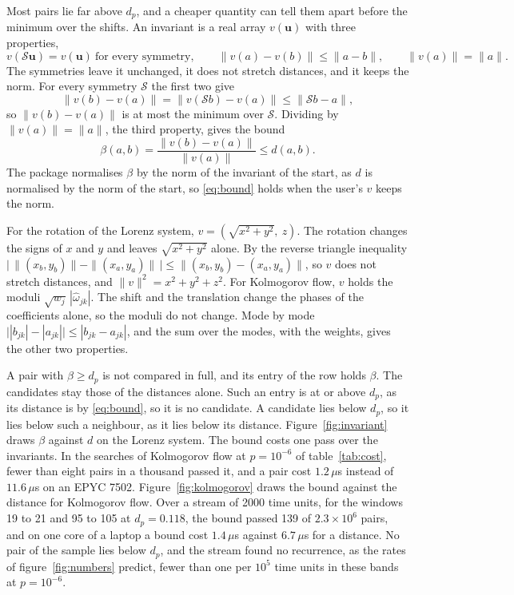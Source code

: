 \documentclass[11pt]{article}
\newcommand{\bu}{\mathbf{u}}
\begin{document}
Most pairs lie far above $d_p$, and a cheaper quantity can tell them apart before the minimum over the shifts. An invariant is a real array $v(\bu)$ with three properties,
\begin{equation}
v(\mathcal{S}\bu) = v(\bu) \ \text{for every symmetry}, \qquad \|v(a) - v(b)\| \le \|a - b\|, \qquad \|v(a)\| = \|a\| .
\label{eq:invariant}
\end{equation}
The symmetries leave it unchanged, it does not stretch distances, and it keeps the norm. For every symmetry $\mathcal{S}$ the first two give
\begin{equation}
\|v(b) - v(a)\| = \|v(\mathcal{S} b) - v(a)\| \le \|\mathcal{S} b - a\| ,
\end{equation}
so $\|v(b) - v(a)\|$ is at most the minimum over $\mathcal{S}$. Dividing by $\|v(a)\| = \|a\|$, the third property, gives the bound
\begin{equation}
\beta(a, b) = \frac{\|v(b) - v(a)\|}{\|v(a)\|} \le d(a, b) .
\label{eq:bound}
\end{equation}
The package normalises $\beta$ by the norm of the invariant of the start, as $d$ is normalised by the norm of the start, so \eqref{eq:bound} holds when the user's $v$ keeps the norm.

For the rotation of the Lorenz system, $v = (\sqrt{x^2 + y^2},\ z)$. The rotation changes the signs of $x$ and $y$ and leaves $\sqrt{x^2 + y^2}$ alone. By the reverse triangle inequality $\big|\,\|(x_b, y_b)\| - \|(x_a, y_a)\|\,\big| \le \|(x_b, y_b) - (x_a, y_a)\|$, so $v$ does not stretch distances, and $\|v\|^2 = x^2 + y^2 + z^2$. For Kolmogorov flow, $v$ holds the moduli $\sqrt{w_j}\,|\hat\omega_{jk}|$. The shift and the translation change the phases of the coefficients alone, so the moduli do not change. Mode by mode $\big||b_{jk}| - |a_{jk}|\big| \le |b_{jk} - a_{jk}|$, and the sum over the modes, with the weights, gives the other two properties.

A pair with $\beta \ge d_p$ is not compared in full, and its entry of the row holds $\beta$. The candidates stay those of the distances alone. Such an entry is at or above $d_p$, as its distance is by \eqref{eq:bound}, so it is no candidate. A candidate lies below $d_p$, so it lies below such a neighbour, as it lies below its distance. Figure~\ref{fig:invariant} draws $\beta$ against $d$ on the Lorenz system. The bound costs one pass over the invariants. In the searches of Kolmogorov flow at $p = 10^{-6}$ of table~\ref{tab:cost}, fewer than eight pairs in a thousand passed it, and a pair cost $1.2\,\mu$s instead of $11.6\,\mu$s on an EPYC 7502. Figure~\ref{fig:kolmogorov} draws the bound against the distance for Kolmogorov flow. Over a stream of 2000 time units, for the windows 19 to 21 and 95 to 105 at $d_p = 0.118$, the bound passed 139 of $2.3 \times 10^6$ pairs, and on one core of a laptop a bound cost $1.4\,\mu$s against $6.7\,\mu$s for a distance. No pair of the sample lies below $d_p$, and the stream found no recurrence, as the rates of figure~\ref{fig:numbers} predict, fewer than one per $10^5$ time units in these bands at $p = 10^{-6}$.
\end{document}
